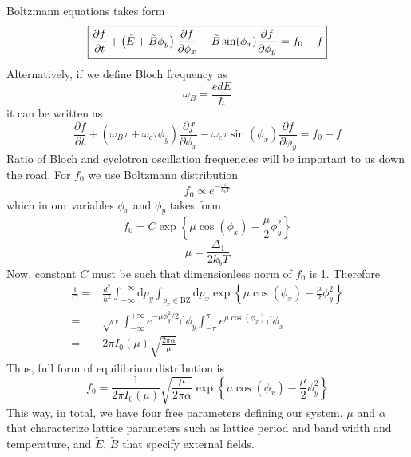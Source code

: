 \documentclass[40pt,letterpaper,physrev]{article}
\begin{document}
   Boltzmann equations takes form
   \begin{equation}
   	\boxed{
   	\label{eq:boltzmann_final}
     \frac{\partial f}{\partial t}+
     \left ( \tilde{E}+\tilde{B}\phi_y\right ) \frac{\partial f}{\partial\phi_x}-
     \tilde{B}\sin(\phi_x)\frac{\partial f}{\partial\phi_y}
     = f_0 - f}
   \end{equation}
   Alternatively, if we define Bloch frequency as
   \begin{equation}
	\omega_B=\frac{edE}{\hbar}
   \end{equation}
   it can be written as 
   \begin{equation}
     \frac{\partial f}{\partial t}+
     \left ( \omega_B\tau+\omega_c\tau\phi_y\right ) \frac{\partial f}{\partial\phi_x}-
     \omega_c\tau\sin(\phi_x)\frac{\partial f}{\partial\phi_y}
     = f_0 - f
   \end{equation} 
    Ratio of Bloch and cyclotron oscillation frequencies will be important to us down the road.
    For $f_0$ we use Boltzmann distribution 
    \begin{equation}
        f_0\propto e^{\displaystyle -\frac{\varepsilon}{k_bT}}
    \end{equation}
    which in our variables $\phi_x$ and $\phi_y$ takes form
    \begin{equation}
	f_0=C\exp{\left \{ \mu\cos(\phi_x)-\frac{\mu}{2}\phi^2_y\right \} }
	\end{equation}
	\begin{equation}
	\boxed{\mu=\frac{\Delta_1}{2k_{b}T}}
    \end{equation} 
    Now, constant $C$ must be such that dimensionless norm of $f_0$ is 1. Therefore
    \begin{align}
       \frac{1}{C}=&\frac{d^2}
	{\hbar^2}\int^{+\infty}_{-\infty}\text{d}p_y\int_{p_x\in\text{BZ}}\text{d}p_x
	\exp{\left \{ \mu\cos(\phi_x)-\frac{\mu}{2}\phi^2_y\right \} } \\
	   =&\sqrt{\alpha}\int^{+\infty}_{-\infty}e^{-\mu\phi^2_y/2}\text{d}\phi_y
	   \int^{\pi}_{-\pi}e^{\mu\cos(\phi_x)}\text{d}\phi_x \\
	   =&2\pi I_0(\mu)\sqrt{\frac{2\pi\alpha}{\mu}}
    \end{align}
    Thus, full form of equilibrium distribution is
    \begin{equation}
    \boxed{
	f_0=\frac{1}{2\pi I_0(\mu)}\sqrt{\frac{\mu}{2\pi\alpha}}\exp{\left \{ \mu\cos(\phi_x)-\frac{\mu}{2}\phi^2_y\right \} } }
	\end{equation}
	This way, in total, we have four free parameters defining our system, $\mu$ and $\alpha$ that characterize lattice parameters such as lattice period and band width and temperature, and $\tilde{E}$, $\tilde{B}$ that specify external fields.
\end{document}
